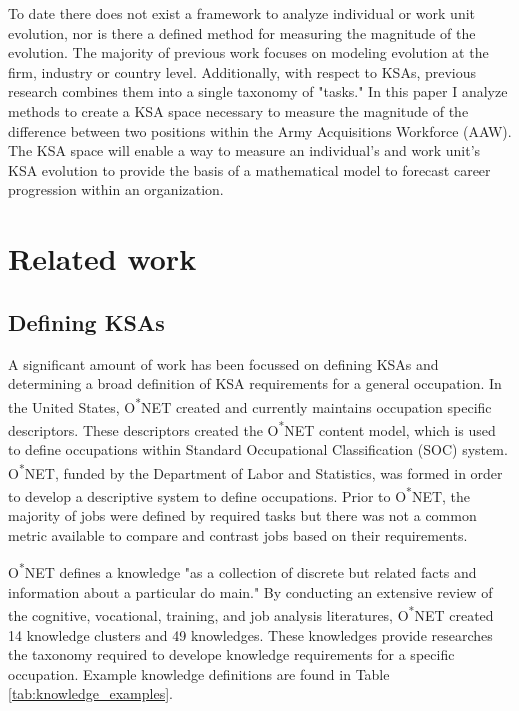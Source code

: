 \documentclass[12pt]{article}
\begin{document}
To date there does not exist a framework to analyze individual or work unit evolution, nor is there a defined method for measuring the magnitude of the evolution. The majority of previous work focuses on modeling evolution at the firm, industry or country level. Additionally, with respect to KSAs, previous research combines them into a single taxonomy of "tasks." In this paper I analyze methods to create a KSA space necessary to measure the magnitude of the difference between two positions within the Army Acquisitions Workforce (AAW). The KSA space will enable a way to measure an individual's and work unit's KSA evolution to provide the basis of a mathematical model to forecast career progression within an organization.

\section{Related work}

\subsection{Defining KSAs}

A significant amount of work has been focussed on defining KSAs and determining a broad definition of KSA requirements for a general occupation. In the United States, O\textsuperscript{*}NET created and currently maintains occupation specific descriptors. These descriptors created the O\textsuperscript{*}NET content model, which is used to define occupations within Standard Occupational Classification (SOC) system. O\textsuperscript{*}NET, funded by the Department of Labor and Statistics, was formed in order to develop a descriptive system to define occupations. Prior to O\textsuperscript{*}NET, the majority of jobs were defined by required tasks but there was not a common metric available to compare and contrast jobs based on their requirements.\cite{onet_content_model}

O\textsuperscript{*}NET defines a knowledge "as a collection of discrete but related facts and information about a particular do main."\cite{knowledges} By conducting an extensive review of the cognitive, vocational, training, and job analysis literatures, O\textsuperscript{*}NET created 14 knowledge clusters and 49 knowledges.\cite{knowledges} These knowledges provide researches the taxonomy required to develope knowledge requirements for a specific occupation. Example knowledge definitions are found in Table \ref{tab:knowledge_examples}.
\end{document}
